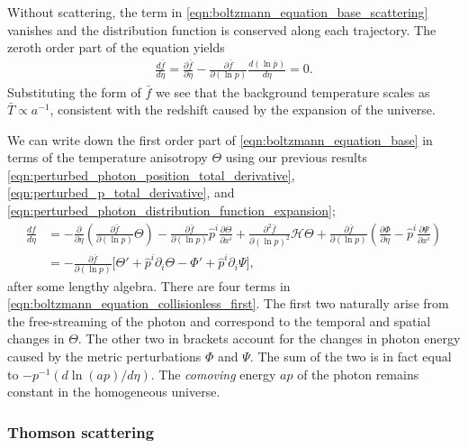 Without scattering, the term in \eqref{eqn:boltzmann_equation_base_scattering} vanishes and the distribution function is conserved along each trajectory. The zeroth order part of the equation yields
\begin{align}
	\frac{d\bar{f}}{d\eta} = \frac{\partial \bar{f}}{\partial\eta} - \frac{\partial \bar{f}}{\partial(\ln p)}\frac{d(\ln\bar{p})}{d\eta} = 0. \label{eqn:boltzmann_equation_collisionless_zeroth}
\end{align}
Substituting the form of $\bar{f}$ we see that the background temperature scales as $\bar{T}\propto a^{-1}$, consistent with the redshift caused by the expansion of the universe.

We can write down the first order part of \eqref{eqn:boltzmann_equation_base} in terms of the temperature anisotropy $\Theta$ using our previous results \eqref{eqn:perturbed_photon_position_total_derivative}, \eqref{eqn:perturbed_p_total_derivative}, and \eqref{eqn:perturbed_photon_distribution_function_expansion};
\begin{align}
	\frac{df}{d\eta} &= - \frac{\partial}{\partial\eta} \left( \frac{\partial \bar{f}}{\partial(\ln p)} \Theta \right) - \frac{\partial \bar{f}}{\partial (\ln p)} \hat{p}^i \frac{\partial \Theta}{\partial x^i} +  \frac{\partial^2 \bar{f}}{\partial(\ln p)^2} \mathcal{H}\Theta + \frac{\partial \bar{f}}{\partial (\ln p)} \left( \frac{\partial \Phi}{\partial \eta} - \hat{p}^i \frac{\partial \Psi}{\partial x^i} \right) \\
	&= - \frac{\partial \bar{f}}{\partial (\ln p)} \biggl[ \Theta' + \hat{p}^i \partial_i \Theta - \Phi' + \hat{p}^i \partial_i \Psi \biggr], \label{eqn:boltzmann_equation_collisionless_first}
\end{align}
after some lengthy algebra. There are four terms in \eqref{eqn:boltzmann_equation_collisionless_first}. The first two naturally arise from the free-streaming of the photon and correspond to the temporal and spatial changes in $\Theta$. The other two in brackets account for the changes in photon energy caused by the metric perturbations $\Phi$ and $\Psi$. The sum of the two is in fact equal to $-p^{-1}(d \ln(ap)/d\eta)$. The \textit{comoving} energy $ap$ of the photon remains constant in the homogeneous universe.


\subsubsection*{Thomson scattering} \label{section:thompson_scattering}

